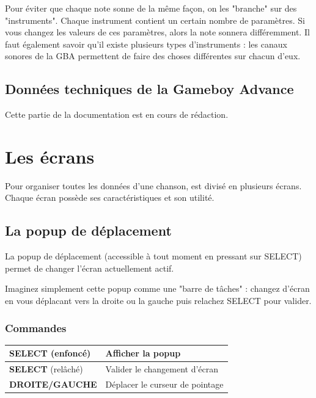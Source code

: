 \documentclass[12pt,a4paper]{article}
\begin{document}
    Pour éviter que chaque note sonne de la même façon, on les "branche" sur des "instruments". Chaque instrument contient un certain nombre de paramètres. Si vous changez les valeurs de ces paramètres, alors la note sonnera différemment. Il faut également savoir qu'il existe plusieurs types d'instruments : les canaux sonores de la GBA permettent de faire des choses différentes sur chacun d'eux.
    
    \subsection{Données techniques de la Gameboy Advance}
    
    \textcolor{vert}{Cette partie de la documentation est en cours de rédaction.}
    
  \section{Les écrans}
  
    Pour organiser toutes les données d'une chanson, \FAT est divisé en plusieurs écrans. Chaque écran possède ses caractéristiques et son utilité.
  
    \subsection{La popup de déplacement}
    
    La popup de déplacement (accessible à tout moment en pressant sur SELECT) permet de changer l'écran actuellement actif. 
    
    
    Imaginez simplement cette popup comme une "barre de tâches" : changez d'écran en vous déplacant vers la droite ou la gauche puis relachez SELECT pour valider.
    
        \subsubsection{Commandes}
        
        \tablelasttail{\hline}
        \begin{supertabular}{|l|l|}
        \hline
            {\bf SELECT} (enfoncé) & Afficher la popup \\
            \hline
            {\bf SELECT} (relâché) & Valider le changement d'écran \\
            \hline
            {\bf DROITE/GAUCHE} & Déplacer le curseur de pointage \\
        \hline
        \end{supertabular}
  
\end{document}
